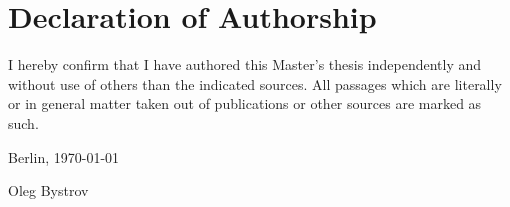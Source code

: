 
\section*{Declaration of Authorship}

I hereby confirm that I have authored this Master's
thesis independently and without use of others than the indicated
sources. All passages which are literally or in general matter
taken out of publications or other sources are marked as such.
\vspace{1cm}

Berlin, \today \vspace{0.5cm}

Oleg Bystrov
